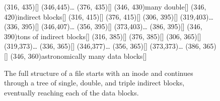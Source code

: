 \begin{figure}
{\begin{graph}
(316, 435){}[]
\freetext(346,445){\ldots}
(376, 435){}[]
(346, 430){many double}[]
(346, 420){indirect blocks}[]
(316, 415){}[]
(376, 415){}[]
(306, 395){}[]
\freetext(319,403){\ldots}
(336, 395){}[]
\freetext(346,407){\ldots}
(356, 395){}[]
\freetext(373,403){\ldots}
(386, 395){}[]
(346, 390){tons of indirect blocks}[]
(316, 385){}[]
(376, 385){}[]
(306, 365){}[]
\freetext(319,373){\ldots}
(336, 365){}[]
\freetext(346,377){\ldots}
(356, 365){}[]
\freetext(373,373){\ldots}
(386, 365){}[]
(346, 360){astronomically many data blocks}[]
\end{graph}}
\fi
\caption{The full structure of a file starts with an inode and
continues through a tree of single, double, and triple indirect
blocks, eventually reaching each of the data blocks.}
\label{inode-block-tree}
\end{figure}

